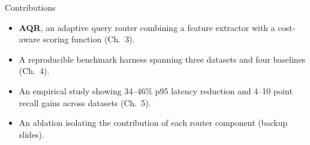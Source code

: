 \begin{frame}{Contributions}
\begin{itemize}[leftmargin=1.8em]
\item[{\textbf{1.}}] \textbf{AQR}, an adaptive query router combining a feature extractor with a cost-aware scoring function (Ch.~3).
\item[{\textbf{2.}}] A reproducible benchmark harness spanning three datasets and four baselines (Ch.~4).
\item[{\textbf{3.}}] An empirical study showing 34--46\% p95 latency reduction and 4--10 point recall gains across datasets (Ch.~5).
\item[{\textbf{4.}}] An ablation isolating the contribution of each router component (backup slides).
\end{itemize}
\end{frame}
